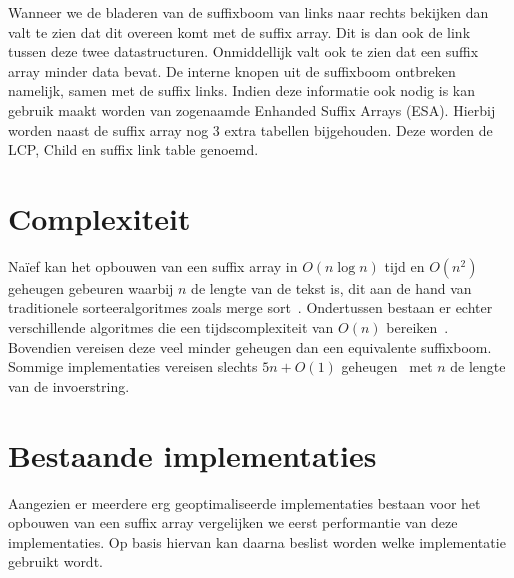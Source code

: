 Wanneer we de bladeren van de suffixboom van links naar rechts bekijken dan valt te zien dat dit overeen komt met de suffix array.
Dit is dan ook de link tussen deze twee datastructuren.
Onmiddellijk valt ook te zien dat een suffix array minder data bevat.
De interne knopen uit de suffixboom ontbreken namelijk, samen met de suffix links.
Indien deze informatie ook nodig is kan gebruik maakt worden van zogenaamde Enhanded Suffix Arrays (ESA).
Hierbij worden naast de suffix array nog 3 extra tabellen bijgehouden.
Deze worden de LCP, Child en suffix link table genoemd.


\section{Complexiteit}\label{sec:complexiteit}
Naïef kan het opbouwen van een suffix array in $O(n \log n)$ tijd en $O(n^2)$ geheugen gebeuren waarbij $n$ de lengte van de tekst is, dit aan de hand van traditionele sorteeralgoritmes zoals merge sort~\cite{mergeSort}.
Ondertussen bestaan er echter verschillende algoritmes die een tijdscomplexiteit van $O(n)$ bereiken~\cite{sais, ko_alura, radixSA, dark_archon, libdivsufsort}.
Bovendien vereisen deze veel minder geheugen dan een equivalente suffixboom.
Sommige implementaties vereisen slechts $5n + O(1)$ geheugen~\cite{dark_archon, libdivsufsort} met $n$ de lengte van de invoerstring.


\section{Bestaande implementaties}\label{sec:bestaande-implementaties}
Aangezien er meerdere erg geoptimaliseerde implementaties bestaan voor het opbouwen van een suffix array vergelijken we eerst performantie van deze implementaties.
Op basis hiervan kan daarna beslist worden welke implementatie gebruikt wordt.

